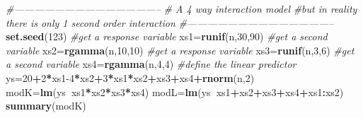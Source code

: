 \documentclass[
]{book}
\newenvironment{Shaded}{\begin{snugshade}}{\end{snugshade}}
\newcommand{\CommentTok}[1]{\textcolor[rgb]{0.56,0.35,0.01}{\textit{#1}}}
\newcommand{\DecValTok}[1]{\textcolor[rgb]{0.00,0.00,0.81}{#1}}
\newcommand{\KeywordTok}[1]{\textcolor[rgb]{0.13,0.29,0.53}{\textbf{#1}}}
\newcommand{\NormalTok}[1]{#1}
\newcommand{\OperatorTok}[1]{\textcolor[rgb]{0.81,0.36,0.00}{\textbf{#1}}}
\begin{document}
\begin{Shaded}
\begin{Highlighting}[]
\CommentTok{#--------------------------------------------}
\CommentTok{# A 4 way interaction model}
\CommentTok{#but in reality there is only 1 second order interaction}
\CommentTok{#--------------------------------------------}
\KeywordTok{set.seed}\NormalTok{(}\DecValTok{123}\NormalTok{)}
\CommentTok{#get a response variable}
\NormalTok{xs1=}\KeywordTok{runif}\NormalTok{(n,}\DecValTok{30}\NormalTok{,}\DecValTok{90}\NormalTok{)}
\CommentTok{#get a second variable}
\NormalTok{xs2=}\KeywordTok{rgamma}\NormalTok{(n,}\DecValTok{10}\NormalTok{,}\DecValTok{10}\NormalTok{)}
\CommentTok{#get a response variable}
\NormalTok{xs3=}\KeywordTok{runif}\NormalTok{(n,}\DecValTok{3}\NormalTok{,}\DecValTok{6}\NormalTok{)}
\CommentTok{#get a second variable}
\NormalTok{xs4=}\KeywordTok{rgamma}\NormalTok{(n,}\DecValTok{4}\NormalTok{,}\DecValTok{4}\NormalTok{)}
\CommentTok{#define the linear predictor}
\NormalTok{ys=}\DecValTok{20}\OperatorTok{+}\DecValTok{2}\OperatorTok{*}\NormalTok{xs1}\DecValTok{-4}\OperatorTok{*}\NormalTok{xs2}\OperatorTok{+}\DecValTok{3}\OperatorTok{*}\NormalTok{xs1}\OperatorTok{*}\NormalTok{xs2}\OperatorTok{+}\NormalTok{xs3}\OperatorTok{+}\NormalTok{xs4}\OperatorTok{+}\KeywordTok{rnorm}\NormalTok{(n,}\DecValTok{2}\NormalTok{)}
\NormalTok{modK=}\KeywordTok{lm}\NormalTok{(ys}\OperatorTok{~}\NormalTok{xs1}\OperatorTok{*}\NormalTok{xs2}\OperatorTok{*}\NormalTok{xs3}\OperatorTok{*}\NormalTok{xs4)}
\NormalTok{modL=}\KeywordTok{lm}\NormalTok{(ys}\OperatorTok{~}\NormalTok{xs1}\OperatorTok{+}\NormalTok{xs2}\OperatorTok{+}\NormalTok{xs3}\OperatorTok{+}\NormalTok{xs4}\OperatorTok{+}\NormalTok{xs1}\OperatorTok{:}\NormalTok{xs2)}
\KeywordTok{summary}\NormalTok{(modK)}
\end{Highlighting}
\end{Shaded}
\end{document}
